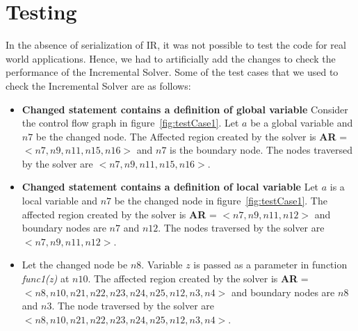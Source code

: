 \documentclass[11pt,a4paper,openright]{report}
\begin{document}


\section{Testing}
In the absence of serialization of IR, it was not possible to test the code for real world applications.
Hence, we had to artificially add the changes to check the performance of the Incremental Solver.
Some of the test cases that we used to check the Incremental Solver are as follows:
\begin{itemize}
 \item \textbf{Changed statement contains a definition of global variable} Consider the control flow graph in figure~\ref{fig:testCase1}. Let $a$ be a global variable
 and $n7$ be the changed node. The Affected region created by the solver is \textbf{AR} = $< n7, n9, n11, n15, n16 >$ and $n7$ is the boundary node.
 The nodes traversed by the solver are $<  n7, n9, n11, n15, n16 >$.
 \item \textbf{Changed statement contains a definition of local variable} Let $a$ is a local variable and $n7$ be the changed node in figure~\ref{fig:testCase1}.
 The affected region created by the solver is \textbf{AR} = $< n7, n9, n11, n12 >$ and boundary nodes are $n7$ and $n12$.
 The nodes traversed by the solver are $<  n7, n9, n11, n12 >$.
 \item Let the changed node be $n8$. Variable $z$ is passed as a parameter in function \textit{func1(z)} at $n10$. The affected region created by the solver is 
 \textbf{AR} = $< n8, n10, n21, n22, n23, n24, n25, n12, n3, n4 >$ and boundary nodes are $n8$ and $n3$. The node traversed by the solver are $< n8, n10, n21, n22, n23, n24, n25, n12, n3, n4 >$.
\end{itemize}
\end{document}
